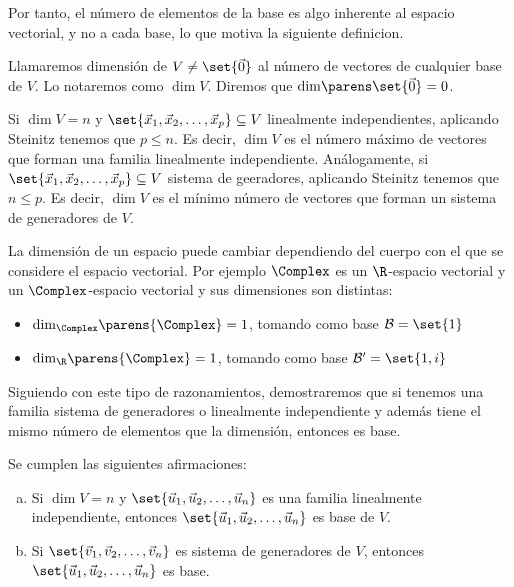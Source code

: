 \documentclass[../algebra_lineal.tex]{subfiles}
\begin{document}
Por tanto, el número de elementos de la base es algo inherente al espacio vectorial, y no a cada base, lo que motiva la siguiente definicion.

\begin{definition}[Dimensión]
    Llamaremos dimensión de $V \ne \set{\zv}$ al número de vectores de cualquier base de $V$. Lo notaremos como $\dim{V}$. Diremos que $\dim{\set{\zv}} = 0$.
\end{definition}

\begin{remark}
    Si $\dim{V} = n$ y $\set{\vlst{x}{p}} \subseteq V$ linealmente independientes, aplicando Steinitz tenemos que $p \le n$. Es decir, $\dim{V}$ es el número máximo de vectores que forman una familia linealmente independiente. Análogamente, si $\set{\vlst{x}{p}} \subseteq V$ sistema de geeradores, aplicando Steinitz tenemos que $n \le p$. Es decir, $\dim{V}$ es el mínimo número de vectores que forman un sistema de generadores de $V$. 
\end{remark}

\begin{example}
    La dimensión de un espacio puede cambiar dependiendo del cuerpo con el que se considere el espacio vectorial. Por ejemplo $\Complex$ es un $\R$-espacio vectorial y un $\Complex$-espacio vectorial y sus dimensiones son distintas:
    \begin{itemize}
        \item $\mathrm{dim}_{\Complex}\parens{\Complex} = 1$, tomando como base $\mathcal{B} = \set{1}$
        \item $\mathrm{dim}_{\R}\parens{\Complex} = 1$, tomando como base $\mathcal{B'} = \set{1, i}$
    \end{itemize}
\end{example}

Siguiendo con este tipo de razonamientos, demostraremos que si tenemos una familia sistema de generadores o linealmente independiente y además tiene el mismo número de elementos que la dimensión, entonces es base.

\begin{corollary}
    Se cumplen las siguientes afirmaciones:
    \begin{enumerate}[a)]
        \item Si $\dim{V} = n$ y $\set{\vlst{u}{n}}$ es una familia linealmente independiente, entonces $\set{\vlst{u}{n}}$ es base de $V$. 
        \item Si $\set{\vlst{v}{n}}$ es sistema de generadores de $V$, entonces $\set{\vlst{u}{n}}$ es base.
    \end{enumerate}
\end{corollary}
\end{document}
